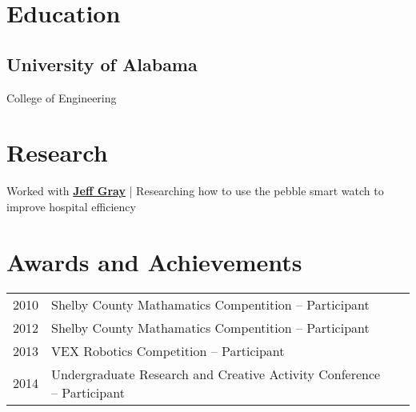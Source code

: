 \documentclass[letterpaper]{deedy-resume} %
\begin{document}
\begin{minipage}[t]{0.66\textwidth} %





\section{Education} 

\subsection{University of Alabama}


College of Engineering \\

\sectionspace %


\section{Research}


Worked with \textbf{\href{http://gray.cs.ua.edu}{Jeff Gray}} | Researching how to use the pebble smart watch to improve hospital efficiency 

\sectionspace %


 \section{Awards and Achievements} 
 \begin{tabular}{rll}
 2010	& Shelby County Mathamatics Compentition -- Participant \\
 2012	& Shelby County Mathamatics Compentition -- Participant \\
 2013 & VEX Robotics Competition -- Participant \\
2014	 &Undergraduate Research and Creative Activity Conference -- Participant \\


\end{tabular}
\end{minipage}
\end{document}
